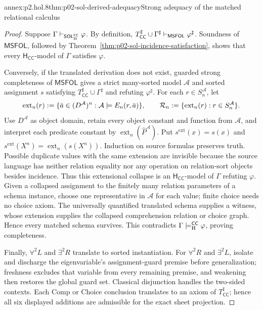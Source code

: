 \begin{annexitem}{annex:p2.hol.8}{thm:p02-sol-derived-adequacy}{Strong adequacy of the matched relational calculus}
\begin{proof}
Suppose
\(\Gamma\vdash_{\mathsf{SOL}_{\mathrm H}^{\mathsf{CC}}}\varphi\).
By definition,
\(T_{\mathsf{CC}}^\sharp\cup\Gamma^\sharp
\vdash_{\mathsf{MSFOL}}\varphi^\sharp\).  Soundness of
\(\mathsf{MSFOL}\), followed by
Theorem~\ref{thm:p02-sol-incidence-satisfaction}, shows that every
\(\mathsf H_{\mathsf{CC}}\)-model of \(\Gamma\) satisfies \(\varphi\).

Conversely, if the translated derivation does not exist, guarded strong
completeness of \(\mathsf{MSFOL}\) gives a strict many-sorted model
\(\mathcal A\) and sorted assignment \(s\) satisfying
\(T_{\mathsf{CC}}^\sharp\cup\Gamma^\sharp\) and refuting
\(\varphi^\sharp\).  For each \(r\in S_n^{\mathcal A}\), let
\[
 \operatorname{ext}_n(r)\mathrel{:=}
 \{\bar a\in(D^{\mathcal A})^n:
   \mathcal A\models E_n(r,\bar a)\},
 \qquad
 \mathcal R_n\mathrel{:=}
 \{\operatorname{ext}_n(r):r\in S_n^{\mathcal A}\}.
\]
Use \(D^{\mathcal A}\) as object domain, retain every object constant and
function from \(\mathcal A\), and interpret each predicate constant by
\(\operatorname{ext}_n(\widehat P^{\mathcal A})\).  Put
\(s^{\mathrm{ext}}(x)=s(x)\) and
\(s^{\mathrm{ext}}(X^n)=\operatorname{ext}_n(s(X^n))\).  Induction on source
formulas preserves truth.  Possible duplicate values with the same extension are
invisible because the source language has neither relation equality nor any
operation on relation-sort objects besides incidence.  Thus this extensional
collapse is an \(\mathsf H_{\mathsf{CC}}\)-model of \(\Gamma\) refuting
\(\varphi\).  Given a collapsed assignment to the finitely many relation
parameters of a schema instance, choose one representative in \(\mathcal A\)
for each value; finite choice needs no choice axiom.  The universally quantified
translated schema supplies a witness, whose extension supplies the collapsed
comprehension relation or choice graph.  Hence every matched schema survives.
This
contradicts \(\Gamma\models_{\mathrm H}^{\mathsf{CC}}\varphi\), proving
completeness.

Finally, \(\forall^2L\) and \(\exists^2R\) translate to sorted
instantiation.  For \(\forall^2R\) and \(\exists^2L\), isolate and discharge
the eigenvariable's assignment-guard premise before generalization; freshness
excludes that variable from every remaining premise, and weakening then
restores the global guard set.
Classical disjunction handles the two-sided contexts.  Each Comp or Choice
conclusion translates to an axiom of \(T_{\mathsf{CC}}^\sharp\); hence all
six displayed additions are admissible for the exact sheet projection.
\end{proof}
\end{annexitem}
